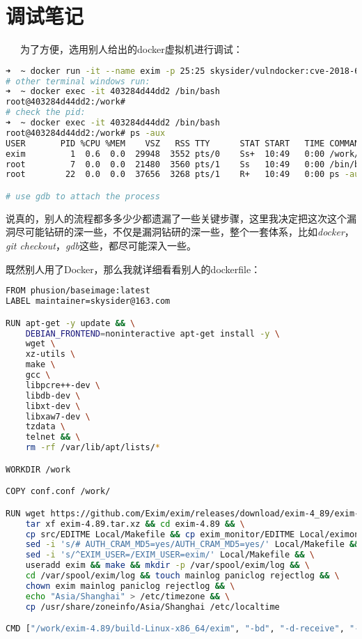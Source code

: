 \documentclass[12pt]{article}  %
\begin{document}
\section{调试笔记} %
\ \ \ 为了方便，选用别人给出的docker虚拟机进行调试：
\begin{lstlisting}[language=sh]
➜  ~ docker run -it --name exim -p 25:25 skysider/vulndocker:cve-2018-6789
# other terminal windows run:
➜  ~ docker exec -it 403284d44dd2 /bin/bash
root@403284d44dd2:/work#
# check the pid:
➜  ~ docker exec -it 403284d44dd2 /bin/bash
root@403284d44dd2:/work# ps -aux
USER       PID %CPU %MEM    VSZ   RSS TTY      STAT START   TIME COMMAND
exim         1  0.6  0.0  29948  3552 pts/0    Ss+  10:49   0:00 /work/exim-4.89
root         7  0.0  0.0  21480  3560 pts/1    Ss   10:49   0:00 /bin/bash
root        22  0.0  0.0  37656  3268 pts/1    R+   10:49   0:00 ps -aux

# use gdb to attach the process

\end{lstlisting}\par
说真的，别人的流程都多多少少都遗漏了一些关键步骤，这里我决定把这次这个漏洞尽可能钻研的深一些，不仅是漏洞钻研的深一些，整个一套体系，比如\emph{docker}，\emph{git checkout}，\emph{gdb}这些，都尽可能深入一些。\par
既然别人用了Docker，那么我就详细看看别人的dockerfile：
\begin{lstlisting}[language=sh]
FROM phusion/baseimage:latest
LABEL maintainer=skysider@163.com

RUN apt-get -y update && \
    DEBIAN_FRONTEND=noninteractive apt-get install -y \
    wget \
    xz-utils \
    make \
    gcc \
    libpcre++-dev \
    libdb-dev \
    libxt-dev \
    libxaw7-dev \
    tzdata \
    telnet && \
    rm -rf /var/lib/apt/lists/*

WORKDIR /work 

COPY conf.conf /work/

RUN wget https://github.com/Exim/exim/releases/download/exim-4_89/exim-4.89.tar.xz && \
    tar xf exim-4.89.tar.xz && cd exim-4.89 && \
    cp src/EDITME Local/Makefile && cp exim_monitor/EDITME Local/eximon.conf && \
    sed -i 's/# AUTH_CRAM_MD5=yes/AUTH_CRAM_MD5=yes/' Local/Makefile && \
    sed -i 's/^EXIM_USER=/EXIM_USER=exim/' Local/Makefile && \
    useradd exim && make && mkdir -p /var/spool/exim/log && \
    cd /var/spool/exim/log && touch mainlog paniclog rejectlog && \
    chown exim mainlog paniclog rejectlog && \
    echo "Asia/Shanghai" > /etc/timezone && \
    cp /usr/share/zoneinfo/Asia/Shanghai /etc/localtime

CMD ["/work/exim-4.89/build-Linux-x86_64/exim", "-bd", "-d-receive", "-C", "conf.conf"]
\end{lstlisting}
\end{document}
